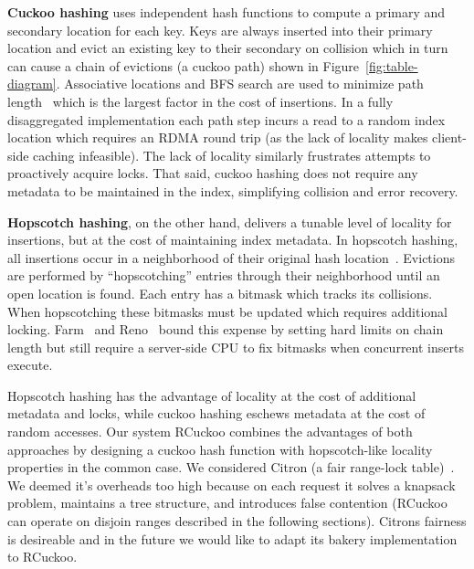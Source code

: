 \textbf{Cuckoo hashing} uses independent hash functions to compute a primary and secondary location
for each key. Keys are always inserted into their primary location and evict an existing key to
their secondary on collision which in turn can cause a chain of evictions (a cuckoo path) shown in
Figure~\ref{fig:table-diagram}. Associative locations and BFS search are used to minimize path
length~\cite{memc3,cuckoo-improvements} which is the largest factor in the cost of insertions. 
In a fully disaggregated implementation each path step incurs a read to a random index location
which requires an RDMA round trip (as the lack of locality makes client-side caching infeasible).  The lack of locality similarly frustrates attempts to proactively acquire locks.
That said, cuckoo hashing
does not require any metadata to be maintained in the index, simplifying collision and error recovery.

\textbf{Hopscotch hashing}, on the other hand, delivers a tunable
level of locality for insertions, but at the cost of maintaining index
metadata.  In hopscotch hashing, all insertions occur in a
neighborhood of their original hash
location~\cite{farm,hopscotch}. Evictions are performed by
``hopscotching'' entries through their neighborhood until an open
location is found.  Each entry has a bitmask which tracks its
collisions. When hopscotching these bitmasks must be updated which
requires additional locking.  Farm~\cite{farm} and Reno~\cite{reno}
bound this expense by setting hard limits on chain length but still
require a server-side CPU to fix bitmasks when concurrent inserts
execute.

Hopscotch hashing has the advantage of locality at the cost of additional metadata and locks, while
cuckoo hashing eschews metadata at the cost of random accesses. Our system RCuckoo combines the
advantages of both approaches by designing a cuckoo hash function with hopscotch-like locality
properties in the common case.
We considered Citron (a fair range-lock table)~\cite{citron}. We deemed it's overheads too high
because on each request it solves a knapsack problem, maintains a tree structure, and introduces
false contention (RCuckoo can operate on disjoin ranges described in the following sections).
Citrons fairness is desireable and in the future we would like to adapt its bakery implementation to
RCuckoo.


